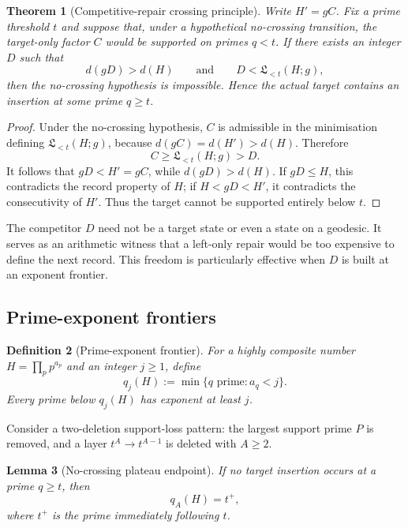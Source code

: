 \documentclass[11pt]{article}
\numberwithin{equation}{section}
\theoremstyle{blueplain}
\newtheorem{theorem}{Theorem}[section]
\newtheorem{lemma}[theorem]{Lemma}
\theoremstyle{bluedef}
\newtheorem{definition}[theorem]{Definition}
\begin{document}
\begin{theorem}[Competitive-repair crossing principle]
\label{thm:competitive-repair}
Write $H'=gC$.  Fix a prime threshold $t$ and suppose that, under a hypothetical no-crossing transition, the target-only factor $C$ would be supported on primes $q<t$.  If there exists an integer $D$ such that
\begin{equation}
 d(gD)>d(H)
 \qquad\text{and}\qquad
 D<\mathfrak L_{<t}(H;g),
 \label{eq:competitive-repair-condition}
\end{equation}
then the no-crossing hypothesis is impossible.  Hence the actual target contains an insertion at some prime $q\ge t$.
\end{theorem}

\begin{proof}
Under the no-crossing hypothesis, $C$ is admissible in the minimisation defining $\mathfrak L_{<t}(H;g)$, because $d(gC)=d(H')>d(H)$.  Therefore
\[
 C\ge\mathfrak L_{<t}(H;g)>D.
\]
It follows that $gD<H'=gC$, while $d(gD)>d(H)$.  If $gD\le H$, this contradicts the record property of $H$; if $H<gD<H'$, it contradicts the consecutivity of $H'$.  Thus the target cannot be supported entirely below $t$.
\end{proof}

The competitor $D$ need not be a target state or even a state on a geodesic.  It serves as an arithmetic witness that a left-only repair would be too expensive to define the next record.  This freedom is particularly effective when $D$ is built at an exponent frontier.

\subsection{Prime-exponent frontiers}

\begin{definition}[Prime-exponent frontier]
\label{def:frontier}
For a highly composite number $H=\prod_p p^{a_p}$ and an integer $j\ge1$, define
\begin{equation}
 q_j(H):=\min\{q\text{ prime}:a_q<j\}.
 \label{eq:frontier-definition}
\end{equation}
Every prime below $q_j(H)$ has exponent at least $j$.
\end{definition}

Consider a two-deletion support-loss pattern: the largest support prime $P$ is removed, and a layer $t^A\to t^{A-1}$ is deleted with $A\ge2$.

\begin{lemma}[No-crossing plateau endpoint]
\label{lem:plateau-endpoint}
If no target insertion occurs at a prime $q\ge t$, then
\begin{equation}
 \boxed{q_A(H)=t^+,}
 \label{eq:plateau-endpoint}
\end{equation}
where $t^+$ is the prime immediately following $t$.
\end{lemma}
\end{document}
